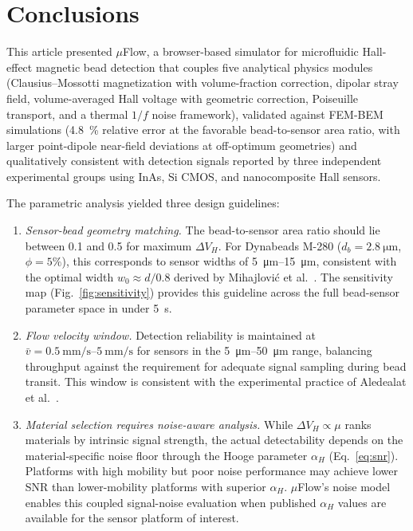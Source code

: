 \documentclass[preprint,review,12pt]{elsarticle}
\begin{document}
\section{Conclusions}
\label{sec:conclusions}

This article presented $\mu$Flow, a browser-based simulator for microfluidic Hall-effect magnetic bead detection that couples five analytical physics modules (Clausius--Mossotti magnetization with volume-fraction correction, dipolar stray field, volume-averaged Hall voltage with geometric correction, Poiseuille transport, and a thermal $1/f$ noise framework), validated against FEM-BEM simulations (\SI{4.8}{\percent} relative error at the favorable bead-to-sensor area ratio, with larger point-dipole near-field deviations at off-optimum geometries) and qualitatively consistent with detection signals reported by three independent experimental groups using InAs, Si CMOS, and nanocomposite Hall sensors.

The parametric analysis yielded three design guidelines:

\begin{enumerate}[nosep]
\item \textit{Sensor-bead geometry matching.} The bead-to-sensor area ratio should lie between 0.1 and 0.5 for maximum $\Delta V_H$. For Dynabeads M-280 ($d_b = \SI{2.8}{\micro\meter}$, $\phi = 5\%$), this corresponds to sensor widths of \SIrange{5}{15}{\micro\meter}, consistent with the optimal width $w_0 \approx d/0.8$ derived by Mihajlovi\'{c} et al.\ \cite{mihajlovic2007}. The sensitivity map (Fig.~\ref{fig:sensitivity}) provides this guideline across the full bead-sensor parameter space in under \SI{5}{\second}.

\item \textit{Flow velocity window.} Detection reliability is maintained at $\bar{v} = \SIrange{0.5}{5}{\milli\meter\per\second}$ for sensors in the \SIrange{5}{50}{\micro\meter} range, balancing throughput against the requirement for adequate signal sampling during bead transit. This window is consistent with the experimental practice of Aledealat et al.\ \cite{aledealat2009}.

\item \textit{Material selection requires noise-aware analysis.} While $\Delta V_H \propto \mu$ ranks materials by intrinsic signal strength, the actual detectability depends on the material-specific noise floor through the Hooge parameter $\alpha_H$ (Eq.~\eqref{eq:snr}). Platforms with high mobility but poor noise performance may achieve lower SNR than lower-mobility platforms with superior $\alpha_H$. $\mu$Flow's noise model enables this coupled signal-noise evaluation when published $\alpha_H$ values are available for the sensor platform of interest.
\end{enumerate}
\end{document}
